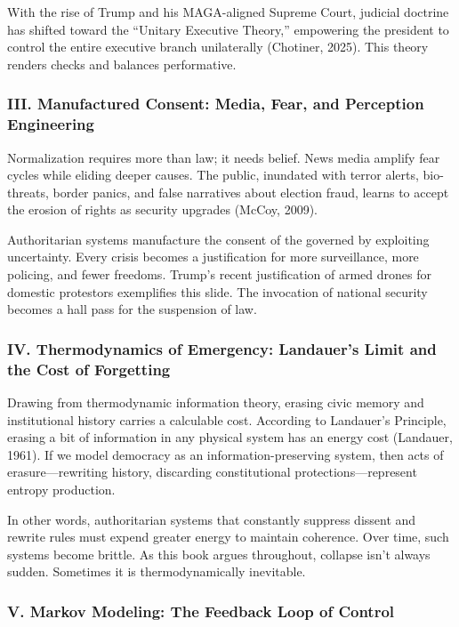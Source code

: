 With the rise of Trump and his MAGA-aligned Supreme Court, judicial
doctrine has shifted toward the ``Unitary Executive Theory,'' empowering
the president to control the entire executive branch unilaterally
(Chotiner, 2025). This theory renders checks and balances performative.

\subsubsection{III. Manufactured Consent: Media, Fear, and Perception
Engineering}\label{iii.-manufactured-consent-media-fear-and-perception-engineering}

Normalization requires more than law; it needs belief. News media
amplify fear cycles while eliding deeper causes. The public, inundated
with terror alerts, bio-threats, border panics, and false narratives
about election fraud, learns to accept the erosion of rights as security
upgrades (McCoy, 2009).

Authoritarian systems manufacture the consent of the governed by
exploiting uncertainty. Every crisis becomes a justification for more
surveillance, more policing, and fewer freedoms. Trump's recent
justification of armed drones for domestic protestors exemplifies this
slide. The invocation of national security becomes a hall pass for the
suspension of law.

\subsubsection{IV. Thermodynamics of Emergency: Landauer's Limit and the
Cost of
Forgetting}\label{iv.-thermodynamics-of-emergency-landauers-limit-and-the-cost-of-forgetting}

Drawing from thermodynamic information theory, erasing civic memory and
institutional history carries a calculable cost. According to Landauer's
Principle, erasing a bit of information in any physical system has an
energy cost (Landauer, 1961). If we model democracy as an
information-preserving system, then acts of erasure---rewriting history,
discarding constitutional protections---represent entropy production.

In other words, authoritarian systems that constantly suppress dissent
and rewrite rules must expend greater energy to maintain coherence. Over
time, such systems become brittle. As this book argues throughout,
collapse isn't always sudden. Sometimes it is thermodynamically
inevitable.

\subsubsection{V. Markov Modeling: The Feedback Loop of
Control}\label{v.-markov-modeling-the-feedback-loop-of-control}

